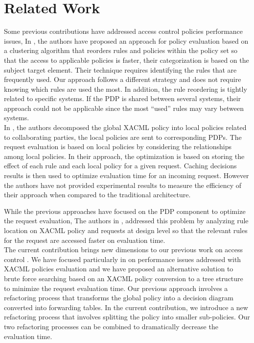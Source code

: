 \section{Related Work} \label{sec:related}
Some previous contributions have addressed access control policies performance issues, In \cite{clustering}, the authors have proposed an approach for policy evaluation based on a 
clustering algorithm that reorders rules and policies within the policy set so that the access to applicable policies is faster, their categorization is based on
 the subject target element. Their technique requires identifying the rules that are frequently used. Our approach follows a different strategy and does not require knowing which 
rules are used the most. In addition, the rule reordering is tightly related to specific systems. If the PDP is shared between several
 systems, their approach could not be applicable since the most ``used'' rules may vary between systems. \\
In \cite{decomposition}, 
the authors decomposed the global XACML policy into local policies related to collaborating parties, the local policies 
are sent to corresponding PDPs. The request evaluation is based on local policies by considering the relationships among local
 policies. In their approach, the optimization is based on storing the effect of each rule and each local policy for 
a given request. Caching decisions results is then used to optimize evaluation time for an incoming request. However the authors have 
not provided experimental results to measure the efficiency of their approach when compared to the traditional architecture.  

While the previous approaches have focused on the PDP component to optimize the request evaluation, The authors in 
\cite{XACMLstructure}, addressed this problem by analyzing rule location on XACML policy and requests at design level so that the relevant rules for the request are 
accessed faster on evaluation time. \\
The current contribution brings new dimensions to our previous work on access control \cite{Xengine} \cite{testcase} \cite{models}.
We have focused particularly in \cite{Xengine} on performance issues addressed with XACML policies evaluation and we have proposed an 
alternative solution to brute force searching based on an XACML policy conversion to a tree structure to minimize the request evaluation time. 
Our previous approach involves a refactoring process that transforms the global policy into a decision diagram converted into 
forwarding tables. In the current contribution, we introduce a new refactoring process that involves splitting the policy into smaller sub-policies. Our 
two refactoring processes can be combined to dramatically decrease the evaluation time. 

